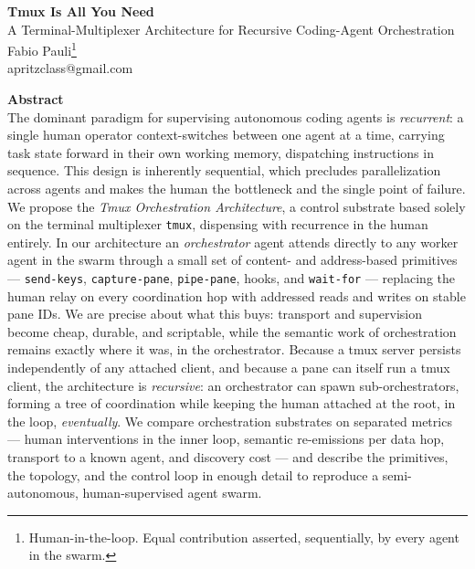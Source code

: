 \documentclass[10pt]{article}
\newcommand{\code}[1]{\texttt{\small #1}}
\begin{document}
\begin{center}
  {\LARGE\bf Tmux Is All You Need}\\[0.4em]
  {\large A Terminal-Multiplexer Architecture for Recursive Coding-Agent Orchestration}\\[1.2em]
  {\large Fabio Pauli\thanks{Human-in-the-loop. Equal contribution asserted, sequentially, by every agent in the swarm.}}\\[0.2em]
  {\ttfamily apritzclass@gmail.com}\\[1.2em]
\end{center}

\begin{center}
\begin{minipage}{0.86\textwidth}
{\bf Abstract}\\[0.4em]
\small
The dominant paradigm for supervising autonomous coding agents is \emph{recurrent}:
a single human operator context-switches between one agent at a time, carrying task
state forward in their own working memory, dispatching instructions in sequence.
This design is inherently sequential, which precludes parallelization across agents
and makes the human the bottleneck and the single point of failure. We propose the
\emph{Tmux Orchestration Architecture}, a control substrate based solely on the
terminal multiplexer \code{tmux}, dispensing with recurrence in the human entirely.
In our architecture an \emph{orchestrator} agent attends directly to any worker
agent in the swarm through a small set of content- and address-based primitives ---
\code{send-keys}, \code{capture-pane}, \code{pipe-pane}, hooks, and \code{wait-for}
--- replacing the human relay on every coordination hop with addressed reads and
writes on stable pane IDs. We are precise about what this buys: transport and
supervision become cheap, durable, and scriptable, while the semantic work of
orchestration remains exactly where it was, in the orchestrator. Because a tmux
server persists
independently of any attached client, and because a pane can itself run a tmux
client, the architecture is \emph{recursive}: an orchestrator can spawn
sub-orchestrators, forming a tree of coordination while keeping the human attached
at the root, in the loop, \emph{eventually}. We compare orchestration substrates on
separated metrics --- human interventions in the inner loop, semantic re-emissions
per data hop, transport to a known agent, and discovery cost --- and describe the
primitives, the topology, and the control loop in enough detail to reproduce a
semi-autonomous, human-supervised agent swarm.
\end{minipage}
\end{center}
\vspace{1.2em}
\end{document}
